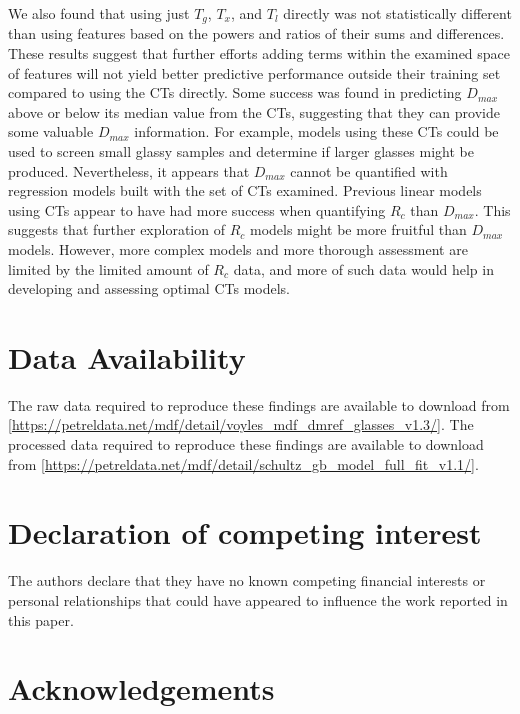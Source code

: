\documentclass[11pt,a4paper]{article}
\begin{document}
\par
We also found that using just $T_{g}$, $T_{x}$, and $T_{l}$ directly was not statistically different than using features based on the powers and ratios of their sums and differences. These results suggest that further efforts adding terms within the examined space of features will not yield better predictive performance outside their training set compared to using the CTs directly. Some success was found in predicting $D_{max}$ above or below its median value from the CTs, suggesting that they can provide some valuable $D_{max}$ information. For example, models using these CTs could be used to screen small glassy samples and determine if larger glasses might be produced. Nevertheless, it appears that $D_{max}$ cannot be quantified with regression models built with the set of CTs examined. Previous linear models using CTs appear to have had more success when quantifying $R_{c}$ than $D_{max}$. This suggests that further exploration of $R_{c}$ models might be more fruitful than $D_{max}$ models. However, more complex models and more thorough assessment are limited by the limited amount of $R_{c}$ data, and more of such data would help in developing and assessing optimal CTs models.

\section*{Data Availability}

\par
The raw data required to reproduce these findings are available to download from [\url{https://petreldata.net/mdf/detail/voyles_mdf_dmref_glasses_v1.3/}]. The processed data required to reproduce these findings are available to download from [\url{https://petreldata.net/mdf/detail/schultz_gb_model_full_fit_v1.1/}].

\section*{Declaration of competing interest}

\par
The authors declare that they have no known competing financial interests or personal relationships that could have appeared to influence the work reported in this paper.

\section*{Acknowledgements}
\end{document}
